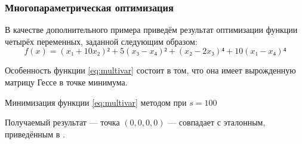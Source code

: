 \subsubsection{Многопараметрическая оптимизация}

В качестве дополнительного примера приведём результат оптимизации
функции четырёх переменных, заданной следующим образом:
\begin{equation}
  \label{eq:multivar}
  f(x) = (x₁ + 10x₂)² + 5(x₃ - x₄)² + (x₂-2x₃)⁴+10(x₁-x₄)⁴
\end{equation}

Особенность функции \eqref{eq:multivar} состоит в том, что она имеет
вырожденную матрицу Гессе в точке минимума.

\begin{table}[h]
  \centering
  
  \caption[\relch{} на функции четырёх переменных]{Минимизация функции \eqref{eq:multivar} методом \relch{} при $s=100$}
  \label{tab:multivar}
\end{table}

Получаемый результат — точка $(0,0,0,0)$ — совпадает с эталонным,
приведённым в \cite{himmelblau75}.
